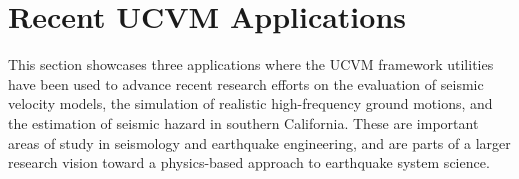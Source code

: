 
\section{Recent UCVM Applications}

This section showcases three applications where the UCVM framework utilities have been used to advance recent research efforts on the evaluation of seismic velocity models, the simulation of realistic high-frequency ground motions, and the estimation of seismic hazard in southern California. These are important areas of study in seismology and earthquake engineering, and are parts of a larger research vision toward a physics-based approach to earthquake system science.













